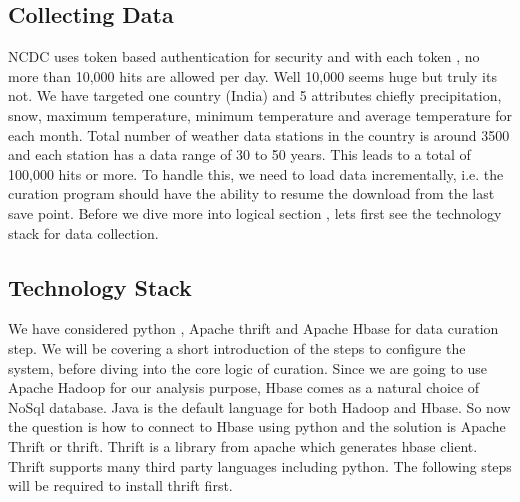 \documentclass[9pt,twocolumn,twoside]{../../styles/osajnl}
\begin{document}
\subsection{Collecting Data}
NCDC uses token based authentication for security and with each token , no more than 10,000 hits are allowed per day. Well 10,000 seems huge but truly its not. We have targeted one country (India) and 5 attributes chiefly precipitation, snow, maximum temperature, minimum temperature and average temperature for each month. Total number of weather data stations in the country is around 3500 and each station has a data range of 30 to 50 years. This leads to a total of 100,000 hits or more. To handle this, we need to load data incrementally, i.e. the curation program should have the ability to resume the download from the last save point. Before we dive more into logical section , lets first see the technology stack for data collection.

\subsection{Technology Stack}
We have considered python , Apache thrift and Apache Hbase for data curation step. We will be covering a short introduction of the steps to configure the system, before diving into the core logic of curation. Since we are going to use Apache Hadoop for our analysis purpose, Hbase comes as a natural choice of NoSql database. Java is the default language for both Hadoop and Hbase. So now the question is how to connect to Hbase using python and the solution is Apache Thrift or thrift. Thrift is a library from apache which generates hbase client. Thrift supports many third party languages including python. The following steps will be required to install thrift first.
\end{document}
